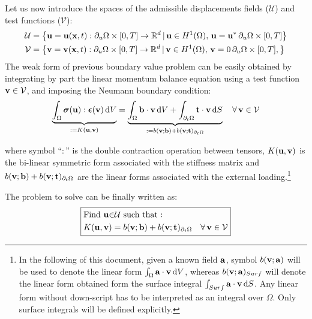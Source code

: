\documentclass{report}
\newcommand{\bx}{\textbf{x}}
\newcommand{\bb}{\textbf{b}}
\newcommand{\bu}{\textbf{u}}
\newcommand{\bv}{\textbf{v}}
\newcommand{\bt}{\boldsymbol t}
\def\bepsilon{\mbox{\boldmath${\epsilon}$}}
\def\bsigma{\mbox{\boldmath${\sigma}$}}
\def\ba{{\bf{a}}}
\def\bb{{\bf{b}}}
\def\bx{{\bf{x}}}
\def\bt{{\bf t}}
\def\bu{{\bf{u}}}
\def\bv{{\bf{v}}}
\begin{document}
Let us now introduce the spaces of the admissible displacements fields ($\mathcal{U}$) and test functions ($\mathcal{V}$):
%
\begin{equation}
\begin{aligned}\mathcal{U} & =\left\{ \bu=\bu(\bx,t):\partial_{u}\Omega\times[0,T]\to\mathbb{R}^{d}\,|\,\bu\in H^{1}(\Omega),\,\bu=\bu^{*}\,\partial_{u}\Omega\times[0,T]\right\} \\
\mathcal{V} & =\left\{ \bv=\bv(\bx,t):\partial_{u}\Omega\times[0,T]\to\mathbb{R}^{d}\,|\,\bv\in H^{1}(\Omega),\,\bv=0\,\partial_{u}\Omega\times[0,T],\right\} 
\end{aligned}
\end{equation}
%
The weak form of previous boundary value problem can be easily obtained
by integrating by part the linear momentum balance equation using
a test function $\bv\in\mathcal{V}$, and imposing the Neumann boundary
condition:
%
\begin{equation}
%
\underbrace{\int_{\Omega}\bsigma(\bu):\bepsilon(\bv)\,{\rm d}V}_{:=K(\bu,\bv)}=\underbrace{\int_{\Omega}\bb\cdot\bv\,{\rm d}V+\int_{\partial_{t}\Omega}\bt\cdot\bv\,{\rm d}S}_{:=b(\bv;\bb)+b(\bv;\bt)_{\partial_{t}\Omega}}\quad\forall\,\bv\in\mathcal{V}
%
\end{equation}

where symbol ``$:$'' is the double contraction operation between
tensors, $K(\bu,\bv)$
is the bi-linear symmetric form associated with the stiffness matrix
and $b(\bv;\bb)+b(\bv;\bt)_{\partial_{t}\Omega}$ are the linear forms
associated with the external loading.\footnote{In the following of this document, given a known field $\ba$, symbol
$b(\bv;\ba)$ will be used to denote the linear form $\int_{\Omega}\ba\cdot\bv\,{\rm d}V$,
whereas $b(\bv;\ba)_{Surf}$ will denote the linear form obtained
form the surface integral $\int_{Surf}\ba\cdot\bv\,{\rm d}S$. Any
linear form without down-script has to be interpreted as an integral
over $\Omega$. Only surface integrals will be defined
explicitly.}

The problem to solve can be finally written as:
\begin{equation}
\boxed{\begin{aligned} & \text{Find \ensuremath{\bu}\ensuremath{\in}\ensuremath{\mathcal{U}} such that : }\\
 & K(\bu,\bv)=b(\bv;\bb)+b(\bv;\bt)_{\partial_{t}\Omega}\quad\forall\,\bv\in\mathcal{V}
\end{aligned}
}
\end{equation}
\end{document}
